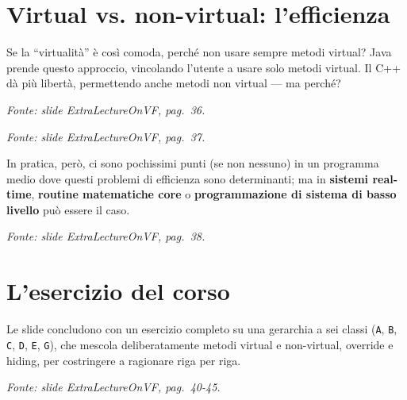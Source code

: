 \documentclass{report}
\newcommand{\code}[1]{\texttt{\small #1}}
\newcommand{\fonteslide}[1]{{\footnotesize\itshape\color{gray} Fonte: slide \emph{ExtraLectureOnVF}, pag.~#1.\par}}
\begin{document}
\chapter{Virtual vs. non-virtual: l'efficienza}\label{ch:efficienza}

Se la ``virtualità'' è così comoda, perché non usare sempre metodi
virtual? Java prende questo approccio, vincolando l'utente a usare solo
metodi virtual. Il C++ dà più libertà, permettendo anche metodi non
virtual --- ma perché?

\fonteslide{36}


\fonteslide{37}

In pratica, però, ci sono pochissimi punti (se non nessuno) in un
programma medio dove questi problemi di efficienza sono determinanti; ma
in \textbf{sistemi real-time}, \textbf{routine matematiche core} o
\textbf{programmazione di sistema di basso livello} può essere il caso.

\fonteslide{38}


\chapter{L'esercizio del corso}\label{ch:esercizio}

Le slide concludono con un esercizio completo su una gerarchia a sei
classi (\code{A}, \code{B}, \code{C}, \code{D}, \code{E}, \code{G}), che
mescola deliberatamente metodi virtual e non-virtual, override e hiding,
per costringere a ragionare riga per riga.

\fonteslide{40-45}
\end{document}
